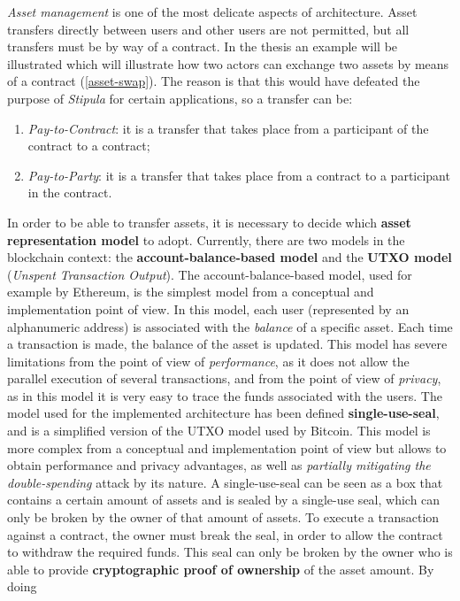 \textit{Asset management} is one of the most delicate aspects of architecture. Asset transfers directly 
between users and other users are not permitted, but all transfers must be by way of a contract. In the 
thesis an example will be illustrated which will illustrate how two actors can exchange two assets by 
means of a contract (\ref{asset-swap}). The reason is that this would have defeated the purpose of 
\textit{Stipula} for certain applications, so a transfer can be:
\begin{enumerate}
	\item \textit{Pay-to-Contract}: it is a transfer that takes place from a participant of the contract 
	to a contract;
	\item \textit{Pay-to-Party}: it is a transfer that takes place from a contract to a participant in the 
	contract.
\end{enumerate}
In order to be able to transfer assets, it is necessary to decide which \textbf{asset representation model} 
to adopt. Currently, there are two models in the blockchain context: the 
\textbf{account-balance-based model} and the \textbf{UTXO model} (\textit{Unspent Transaction Output}). The 
account-balance-based model, used for example by Ethereum, is the simplest model from a conceptual and 
implementation point of view. In this model, each user (represented by an alphanumeric address) is 
associated with the \textit{balance} of a specific asset. Each time a transaction is made, the balance of 
the asset is updated. This model has severe limitations from the point of view of \textit{performance}, as 
it does not allow the parallel execution of several transactions, and from the point of view of 
\textit{privacy}, as in this model it is very easy to trace the funds associated with the users. The model 
used for the implemented architecture has been defined \textbf{single-use-seal}, and is a simplified version 
of the UTXO model used by Bitcoin. This model is more complex from a conceptual and implementation point of 
view but allows to obtain performance and privacy advantages, as well as 
\textit{partially mitigating the double-spending} attack by its nature. A single-use-seal can be seen as a 
box that contains a certain amount of assets and is sealed by a single-use seal, which can only be broken 
by the owner of that amount of assets. To execute a transaction against a contract, the owner must break 
the seal, in order to allow the contract to withdraw the required funds. This seal can only be broken by 
the owner who is able to provide \textbf{cryptographic proof of ownership} of the asset amount. By doing 

